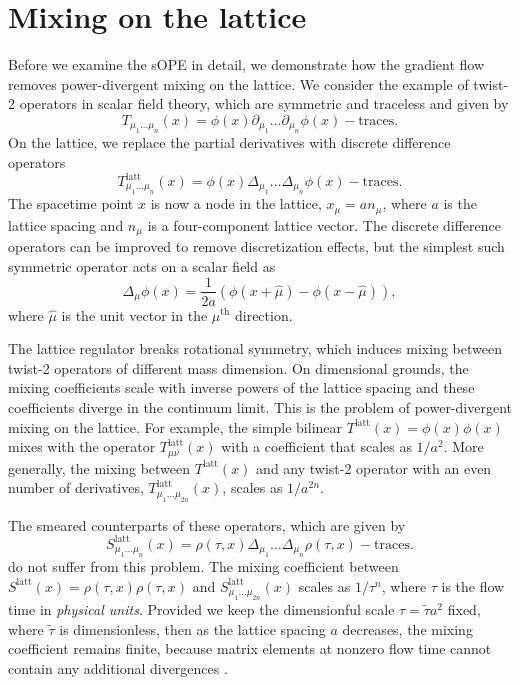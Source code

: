 \section{\label{sec:lattsmear} Mixing on the lattice}

Before we examine the sOPE in detail, we demonstrate how the gradient flow 
removes power-divergent mixing on the lattice. We consider the example of 
twist-2 
operators in scalar field theory, which are symmetric and traceless and given by
\begin{equation}
T_{\mu_1\ldots\mu_n}(x) = \phi(x)\partial_{\mu_1}\ldots 
\partial_{\mu_n}\phi(x) - \mathrm{traces}.
\end{equation}
On the lattice, we replace the partial derivatives with discrete difference 
operators
\begin{equation}
T_{\mu_1\ldots\mu_n}^{\mathrm{latt}}(x) = \phi(x)\Delta_{\mu_1}\ldots 
\Delta_{\mu_n}\phi(x) - 
\mathrm{traces}.
\end{equation}
The spacetime point $x$ is now a node in the lattice, $x_\mu = 
an_\mu$, where $a$ is the lattice spacing and $n_\mu$ is a four-component 
lattice vector. The discrete difference operators can be improved to remove 
discretization effects, but the simplest such symmetric operator acts on a 
scalar field as
\begin{equation}
\Delta_\mu \phi(x) = \frac{1}{2a}\left(\phi(x+\widehat{\mu}) - 
\phi(x-\widehat{\mu})\right),
\end{equation}
where $\hat{\mu}$ is the unit vector in the $\mu^{\mathrm{th}}$ direction.

The lattice regulator breaks rotational symmetry, which induces mixing between 
twist-2 operators of different mass dimension. On dimensional grounds, the 
mixing coefficients scale with inverse powers of the lattice spacing and these 
coefficients diverge in the continuum limit. This is the problem of 
power-divergent mixing on the lattice. For example, the simple
bilinear $T^{\mathrm{latt}}(x) = \phi(x) \phi(x)$ mixes with the 
operator $T_{\mu\nu}^{\mathrm{latt}}(x)$ with 
a coefficient that scales as $1/a^2$. More generally, the mixing between 
$T^{\mathrm{latt}}(x)$ and any twist-2 operator with an even number of 
derivatives, 
$T_{\mu_1\ldots\mu_{2n}}^{\mathrm{latt}}(x)$, scales as $1/a^{2n}$.

The smeared counterparts of these operators, which are given by
\begin{equation}
S_{\mu_1\ldots\mu_n}^{\mathrm{latt}}(x) = 
\rho(\tau,x)\Delta_{\mu_1}\ldots 
\Delta_{\mu_n}\rho(\tau,x) - 
\mathrm{traces}.
\end{equation}
do not suffer from this problem. The mixing coefficient between
$S^{\mathrm{latt}}(x) = \rho(\tau,x) \rho(\tau,x)$ and 
$S_{\mu_1\ldots\mu_{2n}}^{\mathrm{latt}}(x)$ scales as $1/\tau^{n}$, where 
$\tau$ is the flow time in 
\emph{physical units}. Provided we keep
the dimensionful scale $\tau=\widetilde{\tau}a^2$ fixed, where 
$\widetilde{\tau}$ 
is dimensionless, then as the lattice spacing $a$ decreases, the mixing 
coefficient remains finite, because matrix elements at nonzero flow time 
cannot contain any additional divergences \cite{Makino:2014sta,Luscher:2011bx}.

